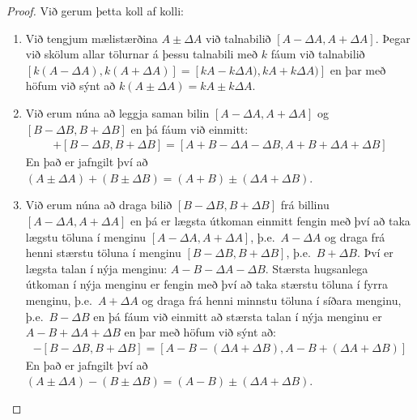\begin{proof} Við gerum þetta koll af kolli:

\begin{enumerate}[label = \textbf{(\roman*)}]
    \item Við tengjum mælistærðina $A\pm \Delta A$ við talnabilið $[A-\Delta A, A + \Delta A]$. Þegar við skölum allar tölurnar á þessu talnabili með $k$ fáum við talnabilið $[k(A-\Delta A), k(A+\Delta A) ] = [kA-k\Delta A), kA+k\Delta A) ]$ en þar með höfum við sýnt að $k(A\pm \Delta A) = k A \pm k \Delta A$.
    
    \item Við erum núna að leggja saman bilin $[A-\Delta A, A+\Delta A ]$ og $[B-\Delta B, B+\Delta B ]$ en þá fáum við einmitt:
    \begin{align*}
        [A-\Delta A, A+\Delta A ] + [B-\Delta B, B+\Delta B ] = [A+B - \Delta A - \Delta B, A + B + \Delta A + \Delta B]
    \end{align*}
    En það er jafngilt því að $(A \pm \Delta A) + (B \pm \Delta B) =  (A+B) \pm (\Delta A + \Delta B)$.
    
    \item Við erum núna að draga bilið $[B-\Delta B, B+\Delta B ]$ frá billinu $[A-\Delta A, A+\Delta A ]$ en þá er lægsta útkoman einmitt fengin með því að taka lægstu töluna í menginu $[A-\Delta A, A+\Delta A ]$, þ.e.~$A - \Delta A$ og draga frá henni stærstu töluna í menginu $[B-\Delta B, B+\Delta B ]$, þ.e.~$B + \Delta B$. Því er lægsta talan í nýja menginu: $A-B - \Delta A - \Delta B$.
    Stærsta hugsanlega útkoman í nýja menginu er fengin með því að taka stærstu töluna í fyrra menginu, þ.e.~$A + \Delta A$ og draga frá henni minnstu töluna í síðara menginu, þ.e.~$B - \Delta B$ en þá fáum við einmitt að stærsta talan í nýja menginu er $A - B + \Delta A + \Delta B $ en þar með höfum við sýnt að:
    \begin{align*}
        [A-\Delta A, A+\Delta A ] - [B-\Delta B, B+\Delta B ] = [A -B - (\Delta A + \Delta B), A - B + (\Delta A + \Delta B)]
    \end{align*}
    En það er jafngilt því að $(A \pm \Delta A) - (B \pm \Delta B) =  (A-B) \pm (\Delta A + \Delta B)$.
    

\end{enumerate}
\end{proof}

